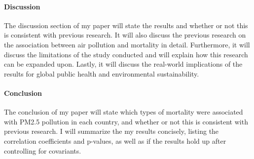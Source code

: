 \documentclass[12pt]{article}\usepackage[]{graphicx}\usepackage[]{xcolor}
\begin{document}
\paragraph{Discussion}
The discussion section of my paper will state the results and whether or not this is consistent with previous research. It will also discuss the previous research on the association between air pollution and mortality in detail. Furthermore, it will discuss the limitations of the study conducted and will explain how this research can be expanded upon. Lastly, it will discuss the real-world implications of the results for global public health and environmental sustainability.

\paragraph{Conclusion}
The conclusion of my paper will state which types of mortality were associated with PM2.5 pollution in each country, and whether or not this is consistent with previous research. I will summarize the my results concisely, listing the correlation coefficients and p-values, as well as if the results hold up after controlling for covariants.



\end{document}
